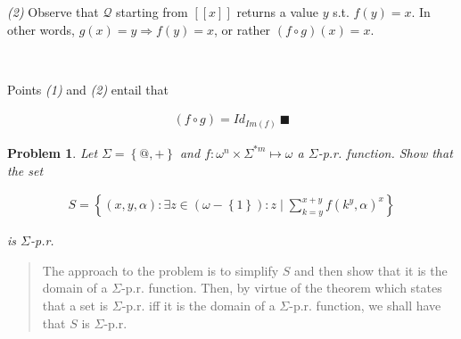 \documentclass[a4paper, 12pt]{article}
\newtheorem{problem}{Problem}
\newtheorem{problem}{Problem}
\begin{document}
\textit{(2)} Observe that $\mathcal{Q}$ starting from $[\![ x ]\!]$ returns a
value $y$ s.t. $f(y) = x$. In other words, $g(x) = y \Rightarrow f(y) = x$, or
rather $(f \circ g)(x) = x$. 

~

Points \textit{(1)} and \textit{(2)} entail that 

\begin{align*}
    (f \circ g) = Id_{Im(f)} ~ \blacksquare
\end{align*}

\pagebreak 

\begin{problem}
    Let $\Sigma = \left\{ @, + \right\} $ and $f : \omega^{n} \times \Sigma^{*m}
    \mapsto \omega$ a $\Sigma$-p.r. function. Show that the set 

    \begin{align*}
        S = \left\{ (x, y, \alpha) : \exists z \in (\omega - \left\{ 1
            \right\})
        : z \mid \sum_{k=y}^{x + y} f(k^y, \alpha)^x \right\} 
    \end{align*}

    is $\Sigma$-p.r. 
\end{problem}


\footnotesize
\begin{quote}

The approach to the problem is to simplify $S$ and then show that it is the
domain of a $\Sigma$-p.r. function. Then, by virtue of the theorem which states
that a set is $\Sigma$-p.r. iff it is the domain of a $\Sigma$-p.r. function, we
shall have that $S$ is $\Sigma$-p.r. 

\end{quote}
\normalsize
\end{document}
